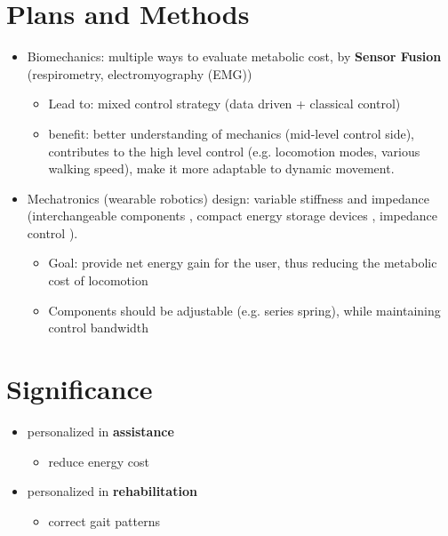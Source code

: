\documentclass{article}
\begin{document}
\section{Plans and Methods}

\begin{itemize}
    \item Biomechanics: multiple ways to evaluate metabolic cost, by \textbf{Sensor Fusion} (respirometry, electromyography (EMG))
    \begin{itemize}
        \item Lead to: mixed control strategy (data driven + classical control)
        \item benefit: better understanding of mechanics (mid-level control side), contributes to the high level control (e.g. locomotion modes, various walking speed), make it more adaptable to dynamic movement.    
    \end{itemize}
    \item Mechatronics (wearable robotics) design: variable stiffness and impedance (interchangeable components \cite{ProsthesisOverview}, compact energy storage devices \cite{OSLSpring}, impedance control \cite{VariableMecheSys}). 
    \begin{itemize}
        \item Goal: provide net energy gain for the user, thus reducing the metabolic cost of locomotion
        \item Components should be adjustable (e.g. series spring), while maintaining control bandwidth \cite{SEABandwidth}
    \end{itemize}
\end{itemize}

\section{Significance}

\begin{itemize}
    \item personalized in \textbf{assistance}
    \begin{itemize}
        \item reduce energy cost \cite{ReduceEnergyCost}
    \end{itemize}
    \item personalized in \textbf{rehabilitation}
    \begin{itemize}
        \item correct gait patterns \cite{GaitCorrection}
    \end{itemize}
\end{itemize}



\end{document}

